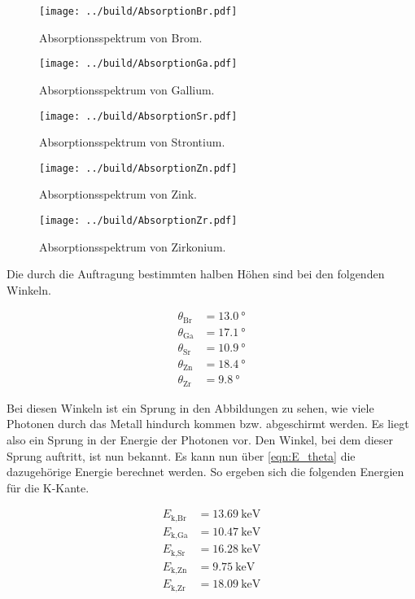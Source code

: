 \begin{figure}[H]
    \centering
    \texttt{[image: ../build/AbsorptionBr.pdf]}
    \caption{Absorptionsspektrum von Brom.}
\end{figure}

\begin{figure}[H]
    \centering
    \texttt{[image: ../build/AbsorptionGa.pdf]}
    \caption{Absorptionsspektrum von Gallium.}
\end{figure}

\begin{figure}[H]
    \centering
    \texttt{[image: ../build/AbsorptionSr.pdf]}
    \caption{Absorptionsspektrum von Strontium.}
\end{figure}

\begin{figure}[H]
    \centering
    \texttt{[image: ../build/AbsorptionZn.pdf]}
    \caption{Absorptionsspektrum von Zink.}
\end{figure}

\begin{figure}[H]
    \centering
    \texttt{[image: ../build/AbsorptionZr.pdf]}
    \caption{Absorptionsspektrum von Zirkonium.}
\end{figure}
    
\noindent Die durch die Auftragung bestimmten halben Höhen sind bei den folgenden Winkeln.

\begin{align*}
    \theta_\text{Br} &= \qty{13.0}{\degree}\\
    \theta_\text{Ga} &= \qty{17.1}{\degree}\\
    \theta_\text{Sr} &= \qty{10.9}{\degree}\\
    \theta_\text{Zn} &= \qty{18.4}{\degree}\\
    \theta_\text{Zr} &= \qty{9.8}{\degree}
\end{align*}

\noindent Bei diesen Winkeln ist ein Sprung in den Abbildungen zu sehen, wie viele Photonen durch das Metall hindurch kommen bzw. abgeschirmt 
werden. Es liegt also ein Sprung in der Energie der Photonen vor. Den Winkel, bei dem dieser Sprung auftritt, ist nun bekannt. Es kann nun über 
\autoref{eqn:E_theta} die dazugehörige Energie berechnet werden. So ergeben sich die folgenden Energien für die K-Kante.

\begin{align*}
    E_\text{k,Br} &= \qty{13.69}{\kilo \electronvolt}\\
    E_\text{k,Ga} &= \qty{10.47}{\kilo \electronvolt}\\
    E_\text{k,Sr} &= \qty{16.28}{\kilo \electronvolt}\\
    E_\text{k,Zn} &= \qty{9.75}{\kilo \electronvolt}\\
    E_\text{k,Zr} &= \qty{18.09}{\kilo \electronvolt}
\end{align*}

